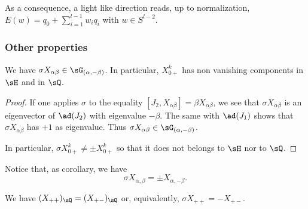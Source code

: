 \begin{remark}	\label{LONGRemOrdreNilpotentQ}
	As a consequence, a light like direction reads, up to normalization, $E(w)=q_0+\sum_{i=1}^{l-1}w_iq_i$ with $w\in S^{l-2}$.
\end{remark}

%
\subsubsection{Other properties}
%


\begin{lemma}		\label{LONGLemXZUAHetQ}
	We have $\sigma X_{\alpha\beta}\in\sG_{(\alpha,-\beta)}$. In particular, $X^k_{0+}$ has non vanishing components in $\sH$ and in $\sQ$.
\end{lemma}

\begin{proof}
	If one applies $\sigma$ to the equality $[J_2,X_{\alpha\beta}]=\beta X_{\alpha\beta}$, we see that $\sigma X_{\alpha\beta}$ is an eigenvector of $\ad(J_2)$ with eigenvalue $-\beta$. The same with $\ad(J_1)$ shows that $\sigma X_{\alpha\beta}$ has $+1$ as eigenvalue. Thus $\sigma X_{\alpha\beta}\in\sG_{(\alpha,-\beta)}$. 
	
	In particular, $\sigma X^k_{0+}\neq \pm X^k_{0+}$ so that it does not belongs to $\sH$ nor to $\sQ$.
\end{proof}

Notice that, as corollary, we have 
\begin{equation}
	\sigma X_{\alpha,\beta}=\pm X_{\alpha,-\beta}.
\end{equation}


\begin{lemma}				\label{LONGLemSigmaXppEgalXPm}
	We have $(X_{++})_{\sQ}=(X_{+-})_{\sQ}$ or, equivalently, $\sigma X_{++}=-X_{+-}$.
\end{lemma}

